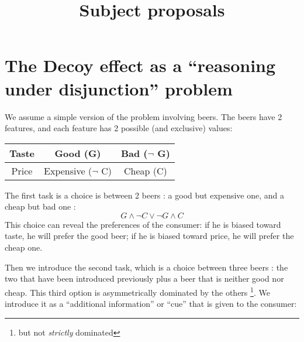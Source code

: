 \documentclass[]{article}
\title{Subject proposals}
\author{}
\begin{document}
\maketitle


\section{The Decoy effect as a ``reasoning under disjunction'' problem}
We assume a simple version of the problem involving beers. The beers have 2 features, and each feature has 2 possible (and exclusive) values:

	\begin{center}
		\begin{tabular}{ |c | c | c|}
	\hline
	Taste & Good (G) & Bad ($\neg$ G) \\ \hline
	Price & Expensive ($\neg$ C) & Cheap (C)\\ \hline
\end{tabular}
	\end{center}
The first task is a choice is between 2 beers : a good but expensive one, and a cheap but bad one :
\begin{equation}
G \wedge \neg C \vee \neg G \wedge C
\end{equation}
This choice can reveal the preferences of the consumer: if he is biased toward taste, he will prefer the good beer; if he is biased toward price, he will prefer the cheap one.

Then we introduce the second task, which is a choice between three beers : the two that have been introduced previously plus a beer that is neither good nor cheap. This third option is asymmetrically dominated by the others \footnote{but not \textit{strictly} dominated}. We introduce it as a ``additional information'' or ``cue'' that is given to the consumer:
\end{document}
